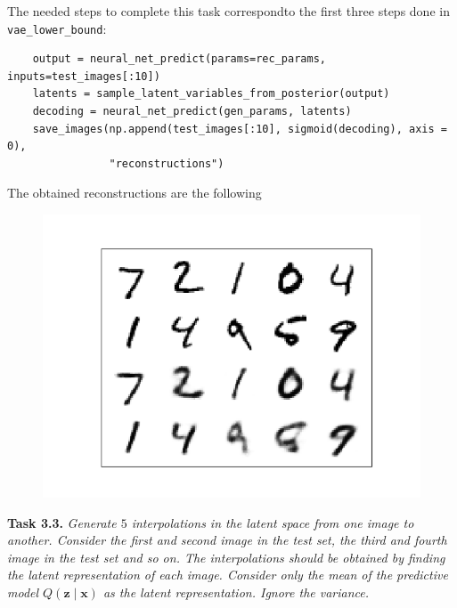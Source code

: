\documentclass[11pt]{article}
\begin{document}
The needed steps to complete this task correspondto the first three steps done in \texttt{vae\_lower\_bound}:
\begin{verbatim}
    output = neural_net_predict(params=rec_params, inputs=test_images[:10])
    latents = sample_latent_variables_from_posterior(output)
    decoding = neural_net_predict(gen_params, latents)
    save_images(np.append(test_images[:10], sigmoid(decoding), axis = 0),
                "reconstructions")

\end{verbatim}


The obtained reconstructions are the following
\begin{figure}[H]
  \centering
  \includegraphics[scale = 0.5]{imgs/reconstructions.png}
\end{figure}

\textbf{Task 3.3.} \emph{Generate \( 5 \)  interpolations in the latent space from one image to another. Consider the first and second image in the test set, the third and fourth image in the test set and so on. The interpolations should be obtained by finding the latent representation of each image. Consider only the mean of the predictive model \( Q(\bm{z} \mid \bm{x}) \)  as the latent representation. Ignore the variance.}
\end{document}
